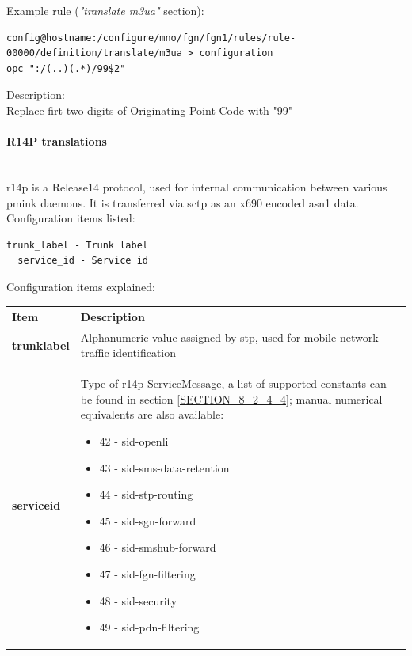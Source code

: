 \documentclass[a4paper,latin]{paper}
\begin{document}
\noindent{}Example rule (\textit{"translate m3ua"} section):
\begin{lstlisting}[style=BashInputStyle, belowskip=\baselineskip]
config@hostname:/configure/mno/fgn/fgn1/rules/rule-00000/definition/translate/m3ua > configuration
opc ":/(..)(.*)/99$2"
\end{lstlisting}
Description:\\
Replace firt two digits of Originating Point Code with "99"\\
\clearpage

\paragraph{R14P translations}
\mbox{}\\
\acrshort{r14p} is a Release14 protocol, used for internal communication between various \acrfull{pmink} \glspl{daemon}. It is transferred via \acrfull{sctp}
as an \gls{x690} encoded \gls{asn1} data.\\

\noindent{}Configuration items listed:
\begin{lstlisting}[style=BashInputStyle, belowskip=\baselineskip]
 trunk_label - Trunk label
  service_id - Service id
\end{lstlisting}
\noindent{}Configuration items explained:\\
\begin{tabularx}{\textwidth}{ | l | X |}
	\hline
	Item	 				& Description \\
	\hline
	\textbf{trunk\textunderscore{}label}	& Alphanumeric value assigned by \acrfull{stp}, used for mobile network traffic identification  \\ 
	\textbf{service\textunderscore{}id}	& Type of \acrshort{r14p}  ServiceMessage, a list of supported constants can be found in
                                                  section \ref{SECTION_8_2_4_4}; manual numerical equivalents are also available: 
 						  \begin{itemize}
							\setlength{\itemsep}{0pt}
							\setlength{\parskip}{0pt}
							\setlength{\parsep}{0pt}
							\item 42 - sid-openli
							\item 43 - sid-sms-data-retention
							\item 44 - sid-stp-routing
							\item 45 - sid-sgn-forward
							\item 46 - sid-smshub-forward
							\item 47 - sid-fgn-filtering
							\item 48 - sid-security
							\item 49 - sid-pdn-filtering
						  \end{itemize} \\
	\hline
\end{tabularx}\\
\end{document}
